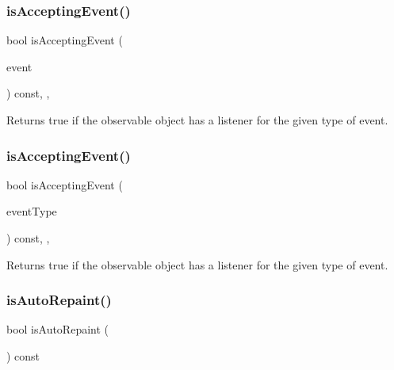 \subsubsection{\texorpdfstring{is\+Accepting\+Event()}{isAcceptingEvent()}\hspace{0.1cm}{\footnotesize\ttfamily [2/3]}}
{\footnotesize\ttfamily bool is\+Accepting\+Event (\begin{DoxyParamCaption}\item[{const \mbox{\hyperlink{classGEvent}{G\+Event}} \&}]{event }\end{DoxyParamCaption}) const\hspace{0.3cm}{\ttfamily [protected]}, {\ttfamily [virtual]}, {\ttfamily [inherited]}}



Returns true if the observable object has a listener for the given type of event. 

\mbox{\label{classGObservable_a3b1c689267eda44e65a2213e7de38b23}} 
\subsubsection{\texorpdfstring{is\+Accepting\+Event()}{isAcceptingEvent()}\hspace{0.1cm}{\footnotesize\ttfamily [3/3]}}
{\footnotesize\ttfamily bool is\+Accepting\+Event (\begin{DoxyParamCaption}\item[{const std\+::string \&}]{event\+Type }\end{DoxyParamCaption}) const\hspace{0.3cm}{\ttfamily [protected]}, {\ttfamily [virtual]}, {\ttfamily [inherited]}}



Returns true if the observable object has a listener for the given type of event. 

\mbox{\label{classGCanvas_aa0b3b78666686fcd2a5b33a20febef0f}} 
\subsubsection{\texorpdfstring{is\+Auto\+Repaint()}{isAutoRepaint()}}
{\footnotesize\ttfamily bool is\+Auto\+Repaint (\begin{DoxyParamCaption}{ }\end{DoxyParamCaption}) const\hspace{0.3cm}{\ttfamily [virtual]}}



